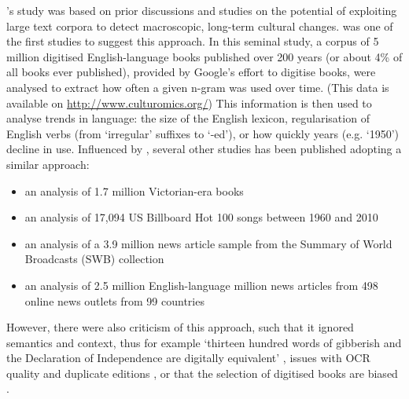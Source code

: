 \documentclass{report}
\begin{document}
\cite{lansdall2017content}'s study was based on prior discussions and studies on the potential of exploiting large text corpora to detect macroscopic, long-term cultural changes. 
\cite{michel2011quantitative} was one of the first studies to suggest this approach.
In this seminal study, a corpus of 5 million digitised English-language books published over 200 years (or about 4\% of all books ever published), provided by Google's effort to digitise books, were analysed to extract how often a given n-gram was used over time. (This data is available on \url{http://www.culturomics.org/})
This information is then used to analyse trends in language: the size of the English lexicon, regularisation of English verbs (from `irregular' suffixes to `-ed'), or how quickly years (e.g. `1950') decline in use.
Influenced by \cite{michel2011quantitative}, several other studies has been published adopting a similar approach: 
\begin{itemize}
	\item an analysis of 1.7 million Victorian-era books \cite{gibbs2011conversation}
	\item an analysis of 17,094 US Billboard Hot 100 songs between 1960 and 2010 \cite{mauch2015evolution}
	\item an analysis of a 3.9 million news article sample from the Summary of World Broadcasts (SWB) collection \cite{leetaru2011culturomics}
	\item an analysis of 2.5 million English-language million news articles from 498 online news outlets from 99 countries \cite{flaounas2013research}
\end{itemize}
However, there were also criticism of this approach, such that it ignored semantics and context, thus for example `thirteen hundred words of gibberish and the Declaration of Independence are digitally equivalent' \cite{gooding2013mass}, issues with OCR quality and duplicate editions \cite{gooding2013mass}, or that the selection of digitised books are biased \cite{schwartz2011culturomics}.
\end{document}
